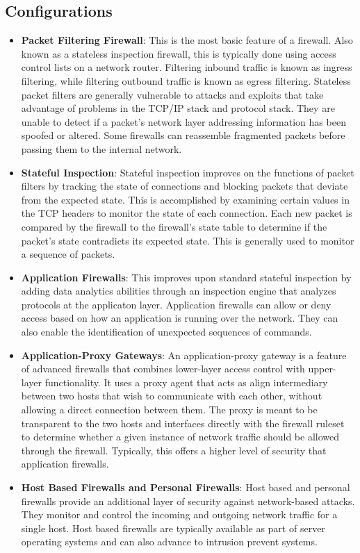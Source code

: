 \documentclass{math}
\begin{document}
\subsection*{Configurations}
\begin{itemize}
  \item \textbf{Packet Filtering Firewall}: This is the most basic feature of a
    firewall. Also known as a stateless inspection firewall, this is typically
    done using access control lists on a network router. Filtering inbound
    traffic is known as ingress filtering, while filtering outbound traffic is
    known as egress filtering. Stateless packet filters are generally
    vulnerable to attacks and exploits that take advantage of problems in the
    TCP/IP stack and protocol stack. They are unable to detect if a packet's
    network layer addressing information has been spoofed or altered. Some
    firewalls can reassemble fragmented packets before passing them to the
    internal network.
  \item \textbf{Stateful Inspection}: Stateful inspection improves on the
    functions of packet filters by tracking the state of connections and
    blocking packets that deviate from the expected state. This is accomplished
    by examining certain values in the TCP headers to monitor the state of each
    connection. Each new packet is compared by the firewall to the firewall's
    state table to determine if the packet's state contradicts its expected
    state. This is generally used to monitor a sequence of packets.
  \item \textbf{Application Firewalls}: This improves upon standard stateful
    inspection by adding data analytics abilities through an inspection engine
    that analyzes protocols at the applicaton layer. Application firewalls can
    allow or deny access based on how an application is running over the
    network. They can also enable the identification of unexpected sequences of
    commands.
  \item \textbf{Application-Proxy Gateways}: An application-proxy gateway is a
    feature of advanced firewalls that combines lower-layer access control with
    upper-layer functionality. It uses a proxy agent that acts as align
    intermediary between two hosts that wish to communicate with each other,
    without allowing a direct connection between them. The proxy is meant to be
    transparent to the two hosts and interfaces directly with the firewall
    ruleset to determine whether a given instance of network traffic should be
    allowed through the firewall. Typically, this offers a higher level of
    security that application firewalls.
  \item \textbf{Host Based Firewalls and Personal Firewalls}: Host based and
    personal firewalls provide an additional layer of security against
    network-based attacks. They monitor and control the incoming and outgoing
    network traffic for a single host. Host based firewalls are typically
    available as part of server operating systems and can also advance to
    intrusion prevent systems.
\end{itemize}
\end{document}
